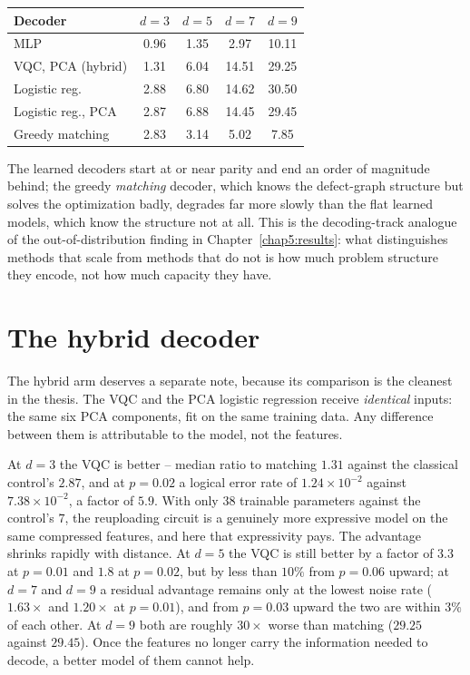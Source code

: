 \documentclass[Thesis.tex]{subfiles}
\begin{document}
\begin{center}
\small
\begin{tabular}{lcccc}
\toprule
\textbf{Decoder} & \textbf{$d=3$} & \textbf{$d=5$} & \textbf{$d=7$} & \textbf{$d=9$} \\
\midrule
MLP                & 0.96 & 1.35 & 2.97 & 10.11 \\
VQC, PCA (hybrid)  & 1.31 & 6.04 & 14.51 & 29.25 \\
Logistic reg.      & 2.88 & 6.80 & 14.62 & 30.50 \\
Logistic reg., PCA & 2.87 & 6.88 & 14.45 & 29.45 \\
Greedy matching    & 2.83 & 3.14 & 5.02 & 7.85 \\
\bottomrule
\end{tabular}
\end{center}

The learned decoders start at or near parity and end an order of magnitude behind;
the greedy \emph{matching} decoder, which knows the defect-graph structure but solves
the optimization badly, degrades far more slowly than the flat learned models, which
know the structure not at all. This is the decoding-track analogue of the
out-of-distribution finding in Chapter~\ref{chap5:results}: what distinguishes
methods that scale from methods that do not is how much problem structure they
encode, not how much capacity they have.

\section{The hybrid decoder}\label{sec:ch6_hybrid}

The hybrid arm deserves a separate note, because its comparison is the cleanest in
the thesis. The VQC and the PCA logistic regression receive \emph{identical} inputs:
the same six PCA components, fit on the same training data. Any difference between
them is attributable to the model, not the features.

At $d = 3$ the VQC is better -- median ratio to matching $1.31$ against the classical
control's $2.87$, and at $p = 0.02$ a logical error rate of $1.24 \times 10^{-2}$
against $7.38 \times 10^{-2}$, a factor of $5.9$. With only $38$ trainable
parameters against the control's $7$, the reuploading circuit is a genuinely more
expressive model on the same compressed features, and here that expressivity pays.
The advantage shrinks rapidly with distance. At $d = 5$ the VQC is still better by
a factor of $3.3$ at $p = 0.01$ and $1.8$ at $p = 0.02$, but by less than $10\%$
from $p = 0.06$ upward; at $d = 7$ and $d = 9$ a residual advantage remains only at the
lowest noise rate ($1.63\times$ and $1.20\times$ at $p = 0.01$), and from $p = 0.03$
upward the two are within $3\%$ of each other. At $d = 9$ both are roughly
$30\times$ worse than matching ($29.25$ against $29.45$). Once the features no longer carry the information needed to decode, a
better model of them cannot help.
\end{document}
